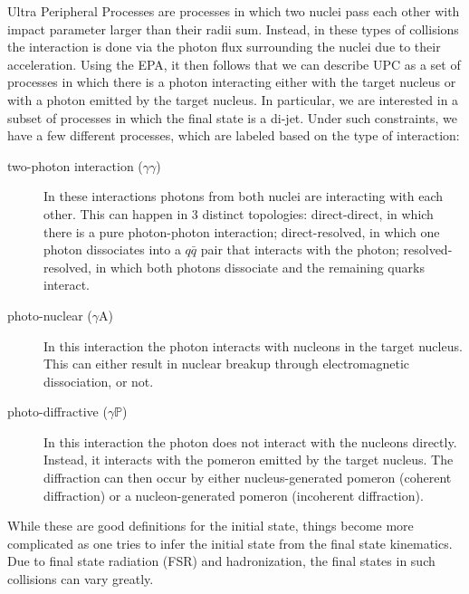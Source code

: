 
Ultra Peripheral Processes are processes in which two nuclei pass each other with impact parameter larger than their radii sum. Instead, in these types of collisions the interaction is done via the photon flux surrounding the nuclei due to their acceleration. Using the EPA, it then follows that we can describe UPC as a set of processes in which there is a photon interacting either with the target nucleus or with a photon emitted by the target nucleus. In particular, we are interested in a subset of processes in which the final state is a di-jet.
Under such  constraints, we have a few different processes, which are labeled based on the type of interaction:

\begin{description}
    \item [two-photon interaction ($\gamma\gamma$)] In these interactions photons from both nuclei are interacting with each other. This can happen in 3 distinct topologies: direct-direct, in which there is a pure photon-photon interaction; direct-resolved, in which one photon dissociates into a $q\bar{q}$ pair that interacts with the photon; resolved-resolved, in which both photons dissociate and the remaining quarks interact.
    \item [photo-nuclear ($\gamma$A)] In this interaction the photon interacts with nucleons in the target nucleus. This can either result in nuclear breakup through electromagnetic dissociation, or not.
    \item [photo-diffractive ($\gamma \mathbb{P}$)] In this interaction the photon does not interact with the nucleons directly. Instead, it interacts with the pomeron emitted by the target nucleus. The diffraction can then occur by either nucleus-generated pomeron (coherent diffraction) or a nucleon-generated pomeron (incoherent diffraction).
\end{description}

While these are good definitions for the initial state, things become more complicated as one tries to infer the initial state from the final state kinematics.  Due to final state radiation (FSR) and hadronization, the final states in such collisions can vary greatly. 
